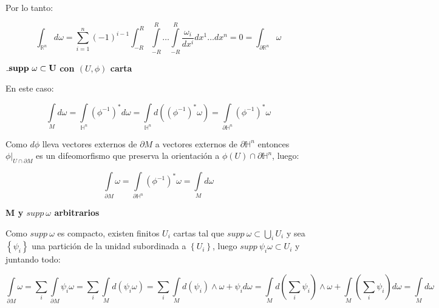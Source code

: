 \documentclass[11pt]{article}
\newcommand{\sett}[1]{\left\lbrace#1\right\rbrace}
\newcommand{\Bigcup}[2]{\bigcup\limits_{#1}{#2}}
\newcommand{\Bigsum}[2]{\sum\limits_{#1}{#2}}
\numberwithin{theorem}{subsection}
\newenvironment{proof}[1][Demostraci\'on]{\begin{trivlist}
		\item[\hskip \labelsep {\bfseries #1}]}{\end{trivlist}}
\newcommand{\qed}{\nobreak \ifvmode \relax \else
	\ifdim\lastskip<1.5em \hskip-\lastskip
	\hskip1.5em plus0em minus0.5em \fi \nobreak
	\vrule height0.75em width0.5em depth0.25em\fi}
\begin{document}
\begin{proof}
	Por lo tanto:
	
		\begin{equation*}
	\int_{\mathbb{R}^n} {d \omega}  = \sum\limits_{i =1 }^{n} {(-1)^{i-1} \int_{-R}^{R} \int\limits_{-R}^{R} \dots \int\limits_{-R}^{R} \dfrac{\omega_i}{dx^i}  dx^1 \dots dx^n} = 0 = \int_{\partial \mathbb{R}^n} {\omega} 
	\end{equation*}
	
			\medskip
	
	$\mathunderscore{\mathbf{supp \ \omega \subset U}}$ \textbf{con $(U,\phi)$ carta}
	
	\medskip
	
	En este caso:
	
	\begin{equation*}
	\int\limits_{M} {d\omega} = \int\limits_{\mathbb{H}^n} {(\phi^{-1})^* d \omega} = \int\limits_{\mathbb{H}^n} {d((\phi^{-1})^* \omega)} = \int\limits_{\partial \mathbb{H}^n} {(\phi^{-1})^* \omega}
	\end{equation*}
	
	Como $d\phi$ lleva vectores externos de $\partial M$ a vectores externos de $\partial \mathbb{H}^n$ entonces $\phi|_{U \cap \partial M}$ es un difeomorfismo que preserva la orientaci\'on a $\phi(U) \cap \partial \mathbb{H}^n$, luego:
	
		\begin{equation*}
		\int\limits_{\partial M} {\omega}  = \int\limits_{\partial \mathbb{H}^n} {(\phi^{-1})^* \omega} = \int\limits_{M} {d\omega} 
		\end{equation*}
	
	\medskip
	
	\textbf{M y $supp \ \omega$ arbitrarios}
	
	\medskip
	
	Como $supp \ \omega$ es compacto, existen finitos $U_i$ cartas tal que $supp \ \omega \subset \Bigcup{i}{U_i}$ y sea $\sett{\psi_i}$ una partici\'on de la unidad subordinada a $\sett{U_i}$, luego $supp \ \psi_i \omega \subset U_i$ y juntando todo:
	
	\begin{equation*}
		\int\limits_{\partial M} {\omega} = \Bigsum{i}{\int\limits_{\partial M}{\psi_i \omega}} = \Bigsum{i}{\int\limits_{M}{d(\psi_i \omega)}} = \Bigsum{i}{\int\limits_{M}{d(\psi_i) \wedge \omega + \psi_i d\omega}} = \int\limits_{M} {d \left(\Bigsum{i}{\psi_i}\right) \wedge \omega} + \int\limits_{M} {\left(\Bigsum{i}{\psi_i} \right) d\omega } = \int\limits_{M}{d \omega}
	\end{equation*}
	\qed
	

\end{proof}
\end{document}
